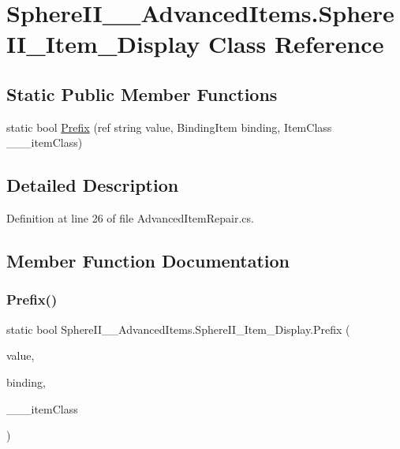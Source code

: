 \hypertarget{class_sphere_i_i_____advanced_items_1_1_sphere_i_i___item___display}{}\section{Sphere\+I\+I\+\_\+\+\_\+\+Advanced\+Items.\+Sphere\+I\+I\+\_\+\+Item\+\_\+\+Display Class Reference}
\label{class_sphere_i_i_____advanced_items_1_1_sphere_i_i___item___display}
\subsection*{Static Public Member Functions}
\begin{DoxyCompactItemize}
\item 
static bool \mbox{\hyperlink{class_sphere_i_i_____advanced_items_1_1_sphere_i_i___item___display_ac3bfe4278318e275dd8c110bd8aedb2b}{Prefix}} (ref string value, Binding\+Item binding, Item\+Class \+\_\+\+\_\+\+\_\+item\+Class)
\end{DoxyCompactItemize}


\subsection{Detailed Description}


Definition at line 26 of file Advanced\+Item\+Repair.\+cs.



\subsection{Member Function Documentation}
\mbox{\label{class_sphere_i_i_____advanced_items_1_1_sphere_i_i___item___display_ac3bfe4278318e275dd8c110bd8aedb2b}} 
\subsubsection{\texorpdfstring{Prefix()}{Prefix()}}
{\footnotesize\ttfamily static bool Sphere\+I\+I\+\_\+\+\_\+\+Advanced\+Items.\+Sphere\+I\+I\+\_\+\+Item\+\_\+\+Display.\+Prefix (\begin{DoxyParamCaption}\item[{ref string}]{value,  }\item[{Binding\+Item}]{binding,  }\item[{Item\+Class}]{\+\_\+\+\_\+\+\_\+item\+Class }\end{DoxyParamCaption})\hspace{0.3cm}{\ttfamily [static]}}



